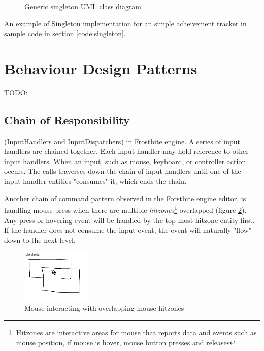 \documentclass[10pt,letterpaper]{article}
\newcommand{\bs}{\bigskip}
\begin{document}
\begin{multicols}{2}
\begin{figure}[H]
	\centering


	\caption{Generic singleton UML class diagram}
	\label{fig:singleton}
\end{figure}

An example of Singleton implementation for an simple acheivement tracker in sample code in section \ref{code:singleton}.

\section{Behaviour Design Patterns}

TODO:

\subsection{Chain of Responsibility}

(InputHandlers and InputDispatchers) in Frostbite engine. A series of input handlers are chained together. Each input handler may hold reference to other input handlers.
\bs
When an input, such as mouse, keyboard, or controller action occurs. The calls traverses down the chain of input handlers until one of the input handler entities "consumes" it, which ends the chain.
\bs

Another chain of command pattern observed in the Forstbite engine editor, is handling mouse press when there are multiple \textit{hitzones}\footnote{Hitzones are interactive areas for mouse that reports data and events such as mouse position, if mouse is hover, mouse button presses and releases} overlapped (figure \ref{fig:chainofcommand-mousezones}). Any press or hovering event will be handled by the top-most hitzone entity first. If the handler does not consume the input event, the event will naturally "flow" down to the next level.
\bs

\begin{figure}[H]
	\centering
	\includegraphics[width=0.3\textwidth]{assets/chainofcommand_mousezones}
	\caption{Mouse interacting with overlapping mouse hitzones}
	\label{fig:chainofcommand-mousezones}
\end{figure}


\end{multicols}
\end{document}
